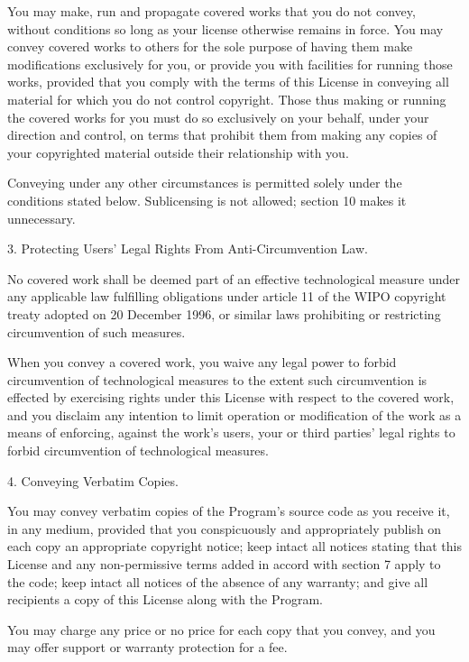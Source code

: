 \documentclass[11pt]{book}
\begin{document}
    You may make, run and propagate covered works that you do not
    convey, without conditions so long as your license otherwise remains
    in force.  You may convey covered works to others for the sole purpose
    of having them make modifications exclusively for you, or provide you
    with facilities for running those works, provided that you comply with
    the terms of this License in conveying all material for which you do
    not control copyright.  Those thus making or running the covered works
    for you must do so exclusively on your behalf, under your direction
    and control, on terms that prohibit them from making any copies of
    your copyrighted material outside their relationship with you.

    Conveying under any other circumstances is permitted solely under
    the conditions stated below.  Sublicensing is not allowed; section 10
    makes it unnecessary.

    3. Protecting Users' Legal Rights From Anti-Circumvention Law.

    No covered work shall be deemed part of an effective technological
    measure under any applicable law fulfilling obligations under article
    11 of the WIPO copyright treaty adopted on 20 December 1996, or
    similar laws prohibiting or restricting circumvention of such
    measures.

    When you convey a covered work, you waive any legal power to forbid
    circumvention of technological measures to the extent such circumvention
    is effected by exercising rights under this License with respect to
    the covered work, and you disclaim any intention to limit operation or
    modification of the work as a means of enforcing, against the work's
    users, your or third parties' legal rights to forbid circumvention of
    technological measures.

    4. Conveying Verbatim Copies.

    You may convey verbatim copies of the Program's source code as you
    receive it, in any medium, provided that you conspicuously and
    appropriately publish on each copy an appropriate copyright notice;
    keep intact all notices stating that this License and any
    non-permissive terms added in accord with section 7 apply to the code;
    keep intact all notices of the absence of any warranty; and give all
    recipients a copy of this License along with the Program.

    You may charge any price or no price for each copy that you convey,
    and you may offer support or warranty protection for a fee.
\end{document}
